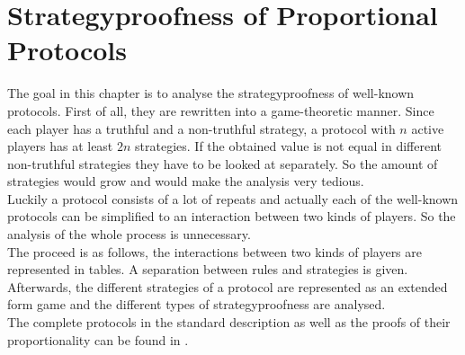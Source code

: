 \section{Strategyproofness of Proportional Protocols}
\label{wehe_dir}
The goal in this chapter is to analyse the strategyproofness of well-known protocols. First of all, they are rewritten into a game-theoretic manner. Since each player has a truthful and a non-truthful strategy, a protocol with $n$ active players has at least $2n$ strategies. If the obtained value is not equal in different non-truthful strategies they have to be looked at separately. So the amount of strategies would grow and would make the analysis very tedious.\\Luckily a protocol consists of a lot of repeats and actually each of the well-known protocols can be simplified to an interaction between two kinds of players. So the analysis of the whole process is unnecessary.\\
The proceed is as follows, the interactions between two kinds of players are represented in tables. A separation between rules and strategies is given. Afterwards, the different strategies of a protocol are represented as an extended form game and the different types of strategyproofness are analysed.\\
The complete protocols in the standard description as well as the proofs of their proportionality can be found in \cite{robertson:cake-cutting}.
